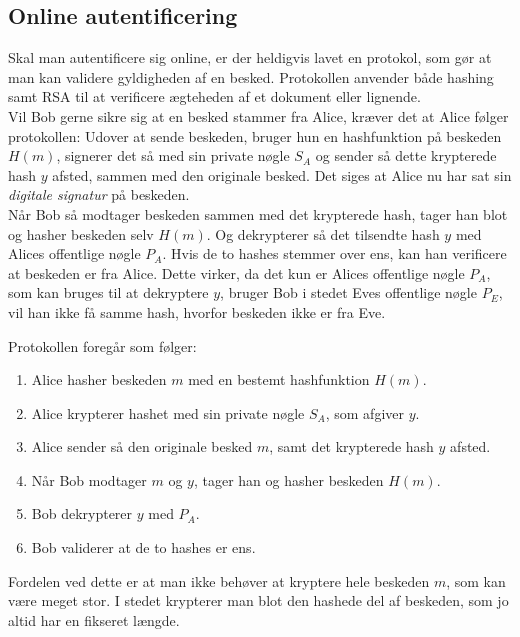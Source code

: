 \subsection{Online autentificering}\label{auth}
Skal man autentificere sig online, er der heldigvis lavet en protokol, som gør at man kan validere gyldigheden af en besked.\cite[12]{dtu}
Protokollen anvender både hashing samt RSA til at verificere ægteheden af et dokument eller lignende.\\
Vil Bob gerne sikre sig at en besked stammer fra Alice, kræver det at Alice følger protokollen:
Udover at sende beskeden, bruger hun en hashfunktion på beskeden \(H(m)\), signerer det så med sin private nøgle \(S_A\) og sender så dette krypterede hash \(y\) afsted, sammen med den originale besked.
Det siges at Alice nu har sat sin \emph{digitale signatur} på beskeden.\\
Når Bob så modtager beskeden sammen med det krypterede hash, tager han blot og hasher beskeden selv \(H(m)\).
Og dekrypterer så det tilsendte hash \(y\) med Alices offentlige nøgle \(P_A\).
Hvis de to hashes stemmer over ens, kan han verificere at beskeden er fra Alice.
Dette virker, da det kun er Alices offentlige nøgle \(P_A\), som kan bruges til at dekryptere \(y\), bruger Bob i stedet Eves offentlige nøgle \(P_E\), vil han ikke få samme hash, hvorfor beskeden ikke er fra Eve.
\par
Protokollen foregår som følger:
\begin{enumerate}[label*=(\arabic*)]%
    \item Alice hasher beskeden \(m\) med en bestemt hashfunktion \(H(m)\).
    \item Alice krypterer hashet med sin private nøgle \(S_A\), som afgiver \(y\).
    \item Alice sender så den originale besked \(m\), samt det krypterede hash \(y\) afsted.
    \item Når Bob modtager \(m\) og \(y\), tager han og hasher beskeden \(H(m)\).
    \item Bob dekrypterer \(y\) med \(P_A\).
    \item Bob validerer at de to hashes er ens.
\end{enumerate}

Fordelen ved dette er at man ikke behøver at kryptere hele beskeden \(m\), som kan være meget stor. I stedet krypterer man blot den hashede del af beskeden, som jo altid har en fikseret længde.


